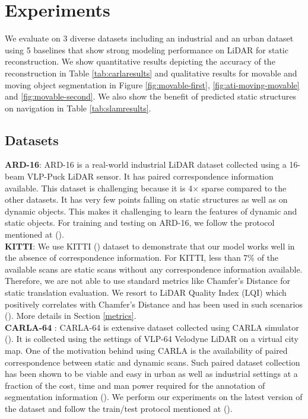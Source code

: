 
\section{Experiments}
We evaluate \dslr{} on 3 diverse datasets including an industrial and an urban dataset using 5 baselines that show strong modeling performance on LiDAR for static reconstruction. We show quantitative results depicting the accuracy of the reconstruction in Table \ref{tab:carlaresults} and qualitative results for movable and moving object segmentation in Figure \ref{fig:movable-first}, \ref{fig:ati-moving-movable} and \ref{fig:movable-second}.
We also show the benefit of predicted static structures on navigation in Table \ref{tab:slamresults}.

\subsection{Datasets}
\textbf{ARD-16}: ARD-16 is a real-world industrial  LiDAR dataset collected using a 16-beam VLP-Puck LiDAR sensor. It has paired correspondence information available. This dataset is challenging because it is 4$\times$ sparse compared to the other datasets. It has very few points falling on static structures as well as on dynamic objects. This makes it challenging to learn the features of dynamic and static objects. For training and testing \dslr{} on ARD-16, we follow the protocol mentioned at (\citet{dslr-git}).\\
\textbf{KITTI}: We use KITTI (\citet{geiger2012we}) dataset to demonstrate that our model works well in the absence of correspondence information. For KITTI, less than 7\% of the available scans are static scans without any correspondence information available. Therefore, we are not able to use standard metrics like Chamfer's Distance for static translation evaluation. We resort to LiDAR Quality Index (LQI) which positively correlates with Chamfer's Distance and has been used in such scenarios (\citet{kumar2021dynamic}). More details in Section \ref{metrics}. \\
 \textbf{CARLA-64} : CARLA-64 is extensive dataset collected using CARLA simulator (\citet{Dosovitskiy17}). It is collected using the settings of VLP-64 Velodyne LiDAR on a virtual city map. One of the motivation behind using CARLA is the availability of paired correspondence between static and dynamic scans. Such paired dataset collection has been shown to be viable and easy in urban as well as industrial settings at a fraction of the cost, time and man power required for the annotation of segmentation information (\citet{kumar2021dynamic}). We perform our experiments on the latest version of the dataset and follow the train/test protocol mentioned at (\citet{dslr-git}). 
 
